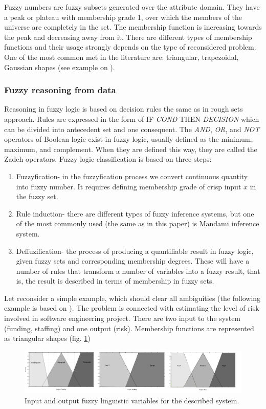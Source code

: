 Fuzzy numbers are fuzzy subsets generated over the attribute domain. 
They have a peak or plateau with membership grade 1, over which the 
members of the universe are completely in the set.  The membership 
function is increasing towards the peak and decreasing away from it. 
There are different types of membership functions and their usage 
strongly depends on the type of reconsidered problem. One of the most 
common met in the literature are: triangular, trapezoidal, Gaussian shapes
(see example on ).

\subsubsection{Fuzzy reasoning from data}
Reasoning in fuzzy logic is based on decision rules the same as in rough sets approach. 
Rules are expressed in the form of IF \textit{COND} THEN \textit{DECISION} 
which can be divided into antecedent set and one consequent. 
The \textit{AND}, \textit{OR}, and \textit{NOT} operators of 
Boolean logic exist in fuzzy logic, usually defined as the minimum, maximum,
and complement. When they are defined this way, they are called the Zadeh operators.
Fuzzy logic classification is based  on three steps:
\begin{enumerate}
    \item Fuzzyfication- in the fuzzyfication process we 
        convert continuous quantity into fuzzy number. It requires defining
        membership grade of crisp input $x$ in the fuzzy set.
    \item Rule induction- there are different types of fuzzy inference systems,
        but one of the most commonly used (the same as in this paper) is
        Mandami inference system.
    \item Deffuzification- the process of producing a quantifiable result in fuzzy logic,
        given fuzzy sets and corresponding membership degrees. These will have a number of
        rules that transform a number of variables into a fuzzy result, that is, the result 
         is described in terms of membership in fuzzy sets. 
\end{enumerate}
Let reconsider a simple example, which should clear all ambiguities (the following 
example is based on \cite{bib20}). The problem is connected with estimating the
level of risk involved in software engineering project. There are two input
to the system (funding, staffing) and one output
(risk). Membership functions are represented as triangular shapes (fig. \ref{fig:fuzzy_example_1}) 
\begin{figure}[H]
    \begin{center}
        \includegraphics[width=\textwidth]{fig/fuzzy_example_1.png}
    \end{center}
    \caption{Input and output fuzzy linguistic variables for the described
    system.}
    \label{fig:fuzzy_example_1}
\end{figure}
